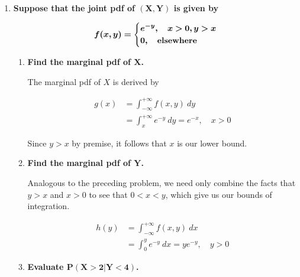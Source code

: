 \documentclass[10pt, oneside]{article}   	%
\theoremstyle{definition}
\begin{document}
\begin{enumerate}[label=6.\arabic*]
\item  \begin{tcolorbox}[
  colback=Cerulean!5!white,
  colframe=Cerulean!75!black]
\textbf{Suppose that the joint pdf of $\bm{(X, Y)}$ is given by}

\[ \bm{f(x,y) =} 
\begin{dcases}
\bm{e^{-y},} \quad \bm{x > 0, y > x} \\
\bm{0,} \quad \textbf{elsewhere}
\end{dcases}
\]
\end{tcolorbox}

\begin{enumerate}
	\item  \begin{tcolorbox}[
	  colback=Cerulean!5!white,
	  colframe=Cerulean!75!black]
	\textbf{Find the marginal pdf of $\bm{X}$.}
	\end{tcolorbox}
	
	The marginal pdf of $X$ is derived by
	
	\begin{align*}
	g(x) &= \int^{+\infty}_{-\infty} f(x,y) \ dy \\
	&= \int^{+\infty}_x e^{-y} \ dy = \boxed{e^{-x}, \quad x > 0}
	\end{align*}
	
	Since $y > x$ by premise, it follows that $x$ is our lower bound.
		
	\item  \begin{tcolorbox}[
	  colback=Cerulean!5!white,
	  colframe=Cerulean!75!black]
	\textbf{Find the marginal pdf of $\bm{Y}$.}
	\end{tcolorbox}
	
	Analogous to the preceding problem, we need only combine the facts that $y > x$ and $x > 0$ to see that $0 < x < y$, which give us our bounds of integration.
	
	\begin{align*}
	h(y) &= \int^{+\infty}_{-\infty} f(x,y) \ dx \\
	&= \int^y_0 e^{-y} \ dx = \boxed{y e^{-y}, \quad y > 0}
	\end{align*}
	
	\item  \begin{tcolorbox}[
	  colback=Cerulean!5!white,
	  colframe=Cerulean!75!black]
	\textbf{Evaluate $\bm{P(X > 2 | Y < 4)}$.}
	\end{tcolorbox}
	

\end{enumerate}
\end{enumerate}
\end{document}

